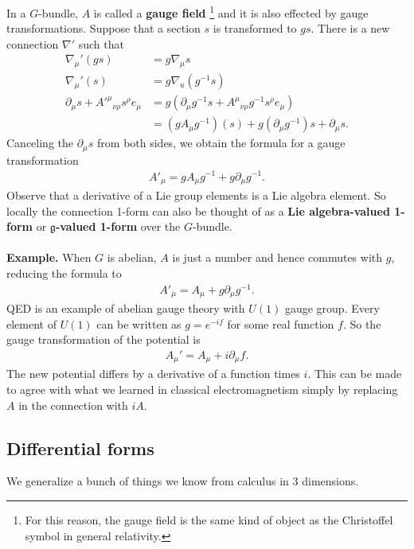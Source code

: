 \documentclass[aps,nofootinbib]{revtex4}
\begin{document}
In a $G$-bundle, $A$ is called a {\bf gauge field} \footnote{For this reason, the gauge field is the same kind of object as the Christoffel symbol in general relativity.} and it is also effected by gauge transformations. Suppose that a section $s$ is transformed to $gs$. There is a new connection $\nabla'$ such that
\begin{align*}
\nabla_{\mu}' (gs) &= g\nabla_{\mu} s \\
\nabla_{\mu}' (s) &= g\nabla_{u} (g^{-1} s) \\
\partial_{\mu} s + A'^{\mu}{}_{\nu \rho} s^{\rho} e_{\mu} &= g \left( \partial_{\mu} g^{-1} s + A^{\mu}{}_{\nu \rho} g^{-1} s^{\rho} e_{\mu} \right) \\
	&= \left( g A_{\mu} g^{-1} \right) (s) + g (\partial_{\mu} g^{-1}) s + \partial_{\mu} s.
\end{align*}
Canceling the $\partial_{\mu} s$ from both sides, we obtain the formula for a gauge transformation
\begin{align}
\boxed{A'_{\mu} = g A_{\mu} g^{-1} + g \partial_{\mu} g^{-1}}.
\end{align}
Observe that a derivative of a Lie group elements is a Lie algebra element. So locally the connection 1-form can also be thought of as a {\bf Lie algebra-valued 1-form} or {\bf $\mathfrak{g}$-valued 1-form} over the $G$-bundle. \\ \\ 
{\bf Example.} When $G$ is abelian, $A$ is just a number and hence commutes with $g$, reducing the formula to
\begin{align}
A'_{\mu} = A_{\mu} + g \partial_{\mu} g^{-1}.
\end{align}
QED is an example of abelian gauge theory with $U(1)$ gauge group. Every element of $U(1)$ can be written as $g = e^{-if}$ for some real function $f$. So the gauge transformation of the potential is
\begin{align}
A_{\mu}' = A_{\mu} + i \partial_{\mu} f.
\end{align}
The new potential differs by a derivative of a function times $i$. This can be made to agree with what we learned in classical electromagnetism simply by replacing $A$ in the connection with $iA$.

\subsection{Differential forms}

We generalize a bunch of things we know from calculus in 3 dimensions.
\end{document}
